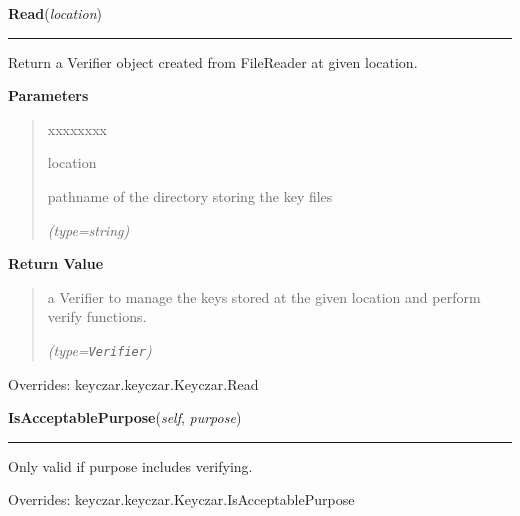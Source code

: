 \hspace{.8\funcindent}\begin{boxedminipage}{\funcwidth}

    \raggedright \textbf{Read}(\textit{location})

    \vspace{-1.5ex}

    \rule{\textwidth}{0.5\fboxrule}
\setlength{\parskip}{2ex}
    Return a Verifier object created from FileReader at given location.

\setlength{\parskip}{1ex}
      \textbf{Parameters}
      \vspace{-1ex}

      \begin{quote}
        \begin{Ventry}{xxxxxxxx}

          \item[location]

          pathname of the directory storing the key files

            {\it (type=string)}

        \end{Ventry}

      \end{quote}

      \textbf{Return Value}
    \vspace{-1ex}

      \begin{quote}
      a Verifier to manage the keys stored at the given location and 
      perform verify functions.

      {\it (type=\texttt{Verifier})}

      \end{quote}

      Overrides: keyczar.keyczar.Keyczar.Read

    \end{boxedminipage}

    \vspace{0.5ex}

\hspace{.8\funcindent}\begin{boxedminipage}{\funcwidth}

    \raggedright \textbf{IsAcceptablePurpose}(\textit{self}, \textit{purpose})

    \vspace{-1.5ex}

    \rule{\textwidth}{0.5\fboxrule}
\setlength{\parskip}{2ex}
    Only valid if purpose includes verifying.

\setlength{\parskip}{1ex}
      Overrides: keyczar.keyczar.Keyczar.IsAcceptablePurpose

    \end{boxedminipage}

